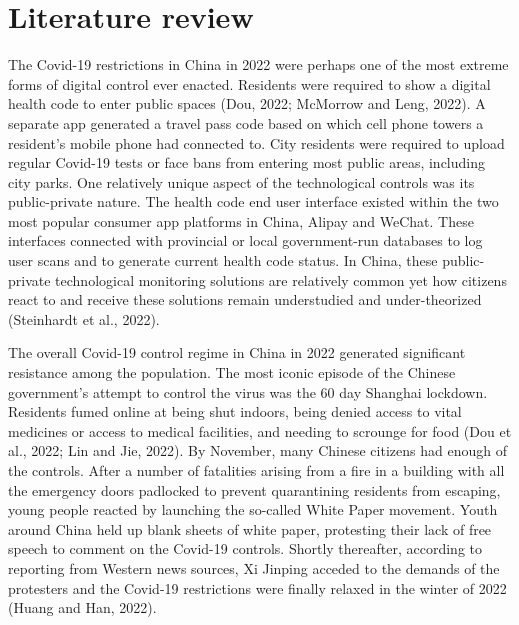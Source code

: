 \documentclass[
  letterpaper,
  DIV=11,
  numbers=noendperiod]{scrartcl}
\begin{document}
\hypertarget{sec-litreview}{%
\section{Literature review}\label{sec-litreview}}

The Covid-19 restrictions in China in 2022 were perhaps one of the most
extreme forms of digital control ever enacted. Residents were required
to show a digital health code to enter public spaces (Dou, 2022;
McMorrow and Leng, 2022). A separate app generated a travel pass code
based on which cell phone towers a resident's mobile phone had connected
to. City residents were required to upload regular Covid-19 tests or
face bans from entering most public areas, including city parks. One
relatively unique aspect of the technological controls was its
public-private nature. The health code end user interface existed within
the two most popular consumer app platforms in China, Alipay and WeChat.
These interfaces connected with provincial or local government-run
databases to log user scans and to generate current health code status.
In China, these public-private technological monitoring solutions are
relatively common yet how citizens react to and receive these solutions
remain understudied and under-theorized (Steinhardt et al., 2022).

The overall Covid-19 control regime in China in 2022 generated
significant resistance among the population. The most iconic episode of
the Chinese government's attempt to control the virus was the 60 day
Shanghai lockdown. Residents fumed online at being shut indoors, being
denied access to vital medicines or access to medical facilities, and
needing to scrounge for food (Dou et al., 2022; Lin and Jie, 2022). By
November, many Chinese citizens had enough of the controls. After a
number of fatalities arising from a fire in a building with all the
emergency doors padlocked to prevent quarantining residents from
escaping, young people reacted by launching the so-called White Paper
movement. Youth around China held up blank sheets of white paper,
protesting their lack of free speech to comment on the Covid-19
controls. Shortly thereafter, according to reporting from Western news
sources, Xi Jinping acceded to the demands of the protesters and the
Covid-19 restrictions were finally relaxed in the winter of 2022 (Huang
and Han, 2022).
\end{document}
